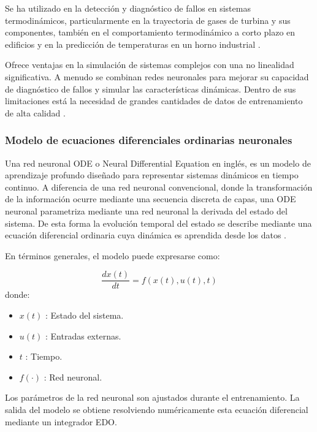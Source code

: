 \documentclass[11pt]{report}
\begin{document}
Se ha utilizado en la detección y diagnóstico de fallos en sistemas termodinámicos, particularmente en la trayectoria de gases de turbina y sus componentes, también en el comportamiento termodinámico a corto plazo en edificios \cite{zhou2024review} y en la predicción de temperaturas en un horno industrial \cite{montero2024modelo}.

Ofrece ventajas en la simulación de sistemas complejos con una no linealidad significativa. A menudo se combinan redes neuronales para mejorar su capacidad de diagnóstico de fallos y simular las características dinámicas. Dentro de sus limitaciones está la necesidad de grandes cantidades de datos de entrenamiento de alta calidad \cite{zhou2024review}.

\subsubsection{ Modelo de ecuaciones diferenciales ordinarias neuronales}

Una red neuronal ODE o Neural Differential Equation en inglés, es un modelo de aprendizaje profundo diseñado para representar sistemas dinámicos en tiempo continuo. A diferencia de una red neuronal convencional, donde la transformación de la información ocurre mediante una secuencia discreta de capas, una ODE neuronal parametriza mediante una red neuronal la derivada del estado del sistema. De esta forma la evolución temporal del estado se describe mediante una ecuación diferencial ordinaria cuya dinámica es aprendida desde los datos \cite{chen2018neural}. 

En términos generales, el modelo puede expresarse como:

\begin{equation}    \label{ecuacionODENEUROA}
\frac{dx(t)}{dt}=f(x(t),u(t),t)
\end{equation}
donde:
\begin{itemize}
    \item $x(t)$ : Estado del sistema.
    \item $u(t)$ : Entradas externas.
    \item $t$ : Tiempo.
    \item $f(\cdot)$ : Red neuronal.
\end{itemize}
Los parámetros de la red neuronal son ajustados durante el entrenamiento. La salida del modelo se obtiene resolviendo numéricamente esta ecuación diferencial mediante un integrador EDO.
\end{document}
